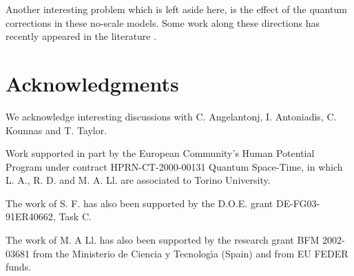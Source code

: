 \documentclass[a4paper,12pt]{article}
\begin{document}
Another interesting problem which is left aside here, is the
effect of the quantum corrections in these no-scale models. Some
work along these directions has recently appeared in the
literature \cite{bbhl,kklt}.






\section*{Acknowledgments}
We acknowledge interesting discussions with C. Angelantonj, I.
Antoniadis, C. Kounnas and T. Taylor.


 Work supported in part by  the European
Community's Human Potential Program under contract
HPRN-CT-2000-00131 Quantum Space-Time, in which L. A.,  R. D. and
M. A. Ll. are associated to Torino University.

The work of S. F. has also  been supported by the D.O.E. grant
DE-FG03-91ER40662, Task C.

The work of M. A Ll. has also been supported by the research grant
BFM 2002-03681 from the Ministerio de Ciencia y Tecnolog\'{\i}a
(Spain) and from EU FEDER funds.
\end{document}
